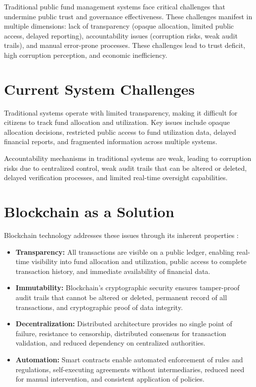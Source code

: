 \documentclass[12pt,a4wide]{report}
\theoremstyle{plain}
\theoremstyle{definition}
\theoremstyle{remark}
\begin{document}
Traditional public fund management systems face critical challenges that undermine public trust and governance effectiveness. These challenges manifest in multiple dimensions: lack of transparency (opaque allocation, limited public access, delayed reporting), accountability issues (corruption risks, weak audit trails), and manual error-prone processes. These challenges lead to trust deficit, high corruption perception, and economic inefficiency.

\section{Current System Challenges}

Traditional systems operate with limited transparency, making it difficult for citizens to track fund allocation and utilization. Key issues include opaque allocation decisions, restricted public access to fund utilization data, delayed financial reports, and fragmented information across multiple systems.

Accountability mechanisms in traditional systems are weak, leading to corruption risks due to centralized control, weak audit trails that can be altered or deleted, delayed verification processes, and limited real-time oversight capabilities.

\section{Blockchain as a Solution}

Blockchain technology addresses these issues through its inherent properties \cite{nakamoto2008}:

\begin{itemize}
    \item \textbf{Transparency:} All transactions are visible on a public ledger, enabling real-time visibility into fund allocation and utilization, public access to complete transaction history, and immediate availability of financial data.
    
    \item \textbf{Immutability:} Blockchain's cryptographic security ensures tamper-proof audit trails that cannot be altered or deleted, permanent record of all transactions, and cryptographic proof of data integrity.
    
    \item \textbf{Decentralization:} Distributed architecture provides no single point of failure, resistance to censorship, distributed consensus for transaction validation, and reduced dependency on centralized authorities.
    
    \item \textbf{Automation:} Smart contracts enable automated enforcement of rules and regulations, self-executing agreements without intermediaries, reduced need for manual intervention, and consistent application of policies.
\end{itemize}
\end{document}
